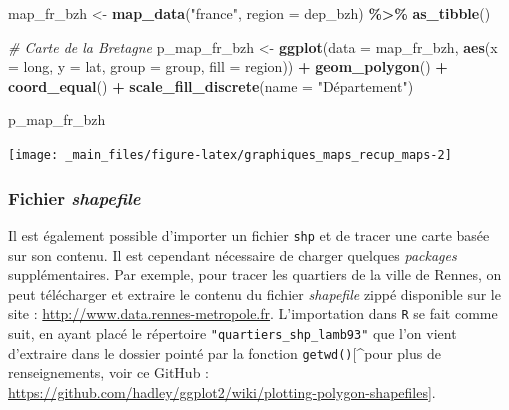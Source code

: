\documentclass[
  11pt,
]{book}
\newenvironment{Shaded}{\begin{snugshade}}{\end{snugshade}}
\newcommand{\CommentTok}[1]{\textcolor[rgb]{0.56,0.35,0.01}{\textit{#1}}}
\newcommand{\DataTypeTok}[1]{\textcolor[rgb]{0.13,0.29,0.53}{#1}}
\newcommand{\KeywordTok}[1]{\textcolor[rgb]{0.13,0.29,0.53}{\textbf{#1}}}
\newcommand{\NormalTok}[1]{#1}
\newcommand{\OperatorTok}[1]{\textcolor[rgb]{0.81,0.36,0.00}{\textbf{#1}}}
\newcommand{\StringTok}[1]{\textcolor[rgb]{0.31,0.60,0.02}{#1}}
\numberwithin{equation}{section}
\numberwithin{countremarque}{section}
\begin{document}
\begin{Shaded}
\begin{Highlighting}[]
\NormalTok{map\_fr\_bzh \textless{}{-}}\StringTok{ }
\StringTok{  }\KeywordTok{map\_data}\NormalTok{(}\StringTok{"france"}\NormalTok{, }\DataTypeTok{region =}\NormalTok{ dep\_bzh) }\OperatorTok{\%\textgreater{}\%}
\StringTok{  }\KeywordTok{as\_tibble}\NormalTok{()}

\CommentTok{\# Carte de la Bretagne}
\NormalTok{p\_map\_fr\_bzh \textless{}{-}}\StringTok{ }
\StringTok{  }\KeywordTok{ggplot}\NormalTok{(}\DataTypeTok{data =}\NormalTok{ map\_fr\_bzh,}
         \KeywordTok{aes}\NormalTok{(}\DataTypeTok{x =}\NormalTok{ long, }\DataTypeTok{y =}\NormalTok{ lat, }\DataTypeTok{group =}\NormalTok{ group, }\DataTypeTok{fill =}\NormalTok{ region)) }\OperatorTok{+}
\StringTok{  }\KeywordTok{geom\_polygon}\NormalTok{() }\OperatorTok{+}\StringTok{ }\KeywordTok{coord\_equal}\NormalTok{() }\OperatorTok{+}\StringTok{ }\KeywordTok{scale\_fill\_discrete}\NormalTok{(}\DataTypeTok{name =} \StringTok{"Département"}\NormalTok{)}

\NormalTok{p\_map\_fr\_bzh}
\end{Highlighting}
\end{Shaded}

\begin{center}\texttt{[image: \_main\_files/figure-latex/graphiques\_maps\_recup\_maps-2]} \end{center}

\hypertarget{graphiques_maps_recup_shapefile}{%
\subsubsection{\texorpdfstring{Fichier \emph{shapefile}}{Fichier shapefile}}\label{graphiques_maps_recup_shapefile}}

Il est également possible d'importer un fichier \texttt{shp} et de tracer une carte basée sur son contenu. Il est cependant nécessaire de charger quelques \emph{packages} supplémentaires. Par exemple, pour tracer les quartiers de la ville de Rennes, on peut télécharger et extraire le contenu du fichier \emph{shapefile} zippé disponible sur le site : \url{http://www.data.rennes-metropole.fr}. L'importation dans \texttt{R} se fait comme suit, en ayant placé le répertoire \texttt{"quartiers\_shp\_lamb93"} que l'on vient d'extraire dans le dossier pointé par la fonction \texttt{getwd()}{[}\^{}pour plus de renseignements, voir ce GitHub : \url{https://github.com/hadley/ggplot2/wiki/plotting-polygon-shapefiles}{]}.
\end{document}
